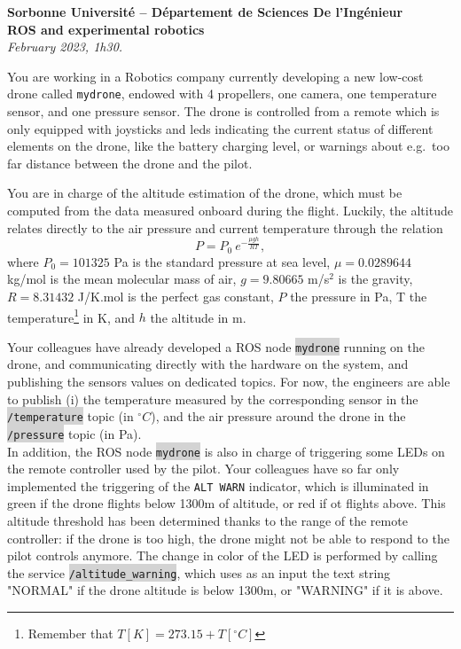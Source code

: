 \documentclass[10pt,a4paper,english]{exam}
\newcommand{\mytext}[1]{\colorbox{lightgray}{\texttt{#1}}}
\begin{document}
{\large
\begin{center}
	{
		\textbf{Sorbonne Université -- Département de Sciences De l'Ingénieur\\}
		\textbf{ROS and experimental robotics}}\\
	\emph{February 2023, 1h30. \\
	}
\end{center}}

You are working in a Robotics company currently developing a new low-cost drone called \texttt{mydrone},
endowed with 4 propellers, one camera, one temperature sensor, and one pressure sensor. The drone is
controlled from a remote which is only equipped with joysticks and leds indicating the current
status of different elements on the drone, like the battery charging level, or warnings about e.g.\
too far distance between the drone and the pilot.

You are in charge of the altitude estimation of the drone, which must be computed from the
data measured onboard during  the flight. Luckily, the altitude relates directly to the air pressure
and current temperature through the relation
%
\begin{equation}
	P = P_0\ e^{-\frac{\mu g h}{R T}},
	\label{eq:altitude}
\end{equation}
%
where $P_0 = 101325$ Pa is the standard pressure at sea level, $\mu = 0.0289644$ kg/mol is the mean
molecular mass of air, $g=9.80665$ m/s$^2$ is the gravity, $R = 8.31432$ J/K.mol is the perfect gas
constant, $P$ the pressure in Pa, T the temperature\footnote{Remember that $T[K] = 273.15 +
		T[^{\circ}C]$} in K, and $h$ the altitude in m.

Your colleagues have already developed a ROS node \mytext{mydrone} running on the drone, and
communicating directly with the hardware on the system, and publishing the sensors values on
dedicated topics. For now, the engineers are able to publish (i) the temperature measured by the
corresponding sensor in the \mytext{/temperature} topic (in $^\circ C$), and the air pressure around
the drone in the \mytext{/pressure} topic (in Pa). \\

In addition, the ROS node \mytext{mydrone} is also in charge of triggering some LEDs on the remote
controller used by the pilot. Your colleagues have so far only implemented the triggering of the
\texttt{ALT WARN} indicator, which is illuminated in green if the drone flights below 1300m of
altitude, or red if ot flights above. This altitude threshold has been determined thanks to the
range of the remote controller: if the drone is too high, the drone might not be able to respond to
the pilot controls anymore. The change in color of the LED is performed by calling the service
\mytext{/altitude\_warning}, which uses as an input the text string "NORMAL" if the drone altitude
is below 1300m, or "WARNING" if it is above.\\
\end{document}
